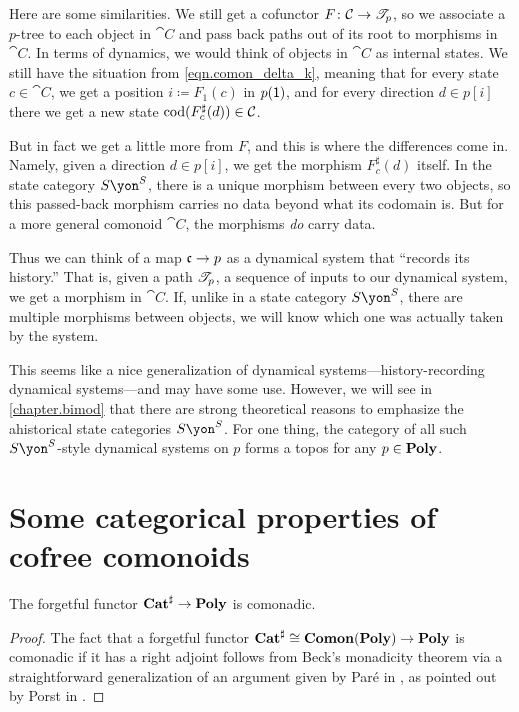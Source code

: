 \documentclass[Book-Poly]{subfiles}
\begin{document}
Here are some similarities. We still get a cofunctor $F\colon\mathcal{C}\to\mathscr{T}_{p}$, so we associate a $p$-tree to each object in $\cat{C}$ and pass back paths out of its root to morphisms in $\cat{C}$. In terms of dynamics, we would think of objects in $\cat{C}$ as internal states. We still have the situation from \eqref{eqn.comon_delta_k}, meaning that for every state $c\in\cat{C}$, we get a position $i\coloneqq F_1(c)$ in $p(\textsf{1})$, and for every direction $d\in p[i]$ there we get a new state $\operatorname{cod}(F^\sharp_c(d))\in\mathcal{C}$. 

But in fact we get a little more from $F$, and this is where the differences come in. Namely, given a direction $d\in p[i]$, we get the morphism $F^\sharp_c(d)$ itself. In the state category $S\yon^S$, there is a unique morphism between every two objects, so this passed-back morphism carries no data beyond what its codomain is. But for a more general comonoid $\cat{C}$, the morphisms \emph{do} carry data. 

Thus we can think of a map $\mathfrak{c}\to p$ as a dynamical system that ``records its history.'' That is, given a path $\mathscr{T}_{p}$, a sequence of inputs to our dynamical system, we get a morphism in $\cat{C}$. If, unlike in a state category $S\yon^S$, there are multiple morphisms between objects, we will know which one was actually taken by the system.

This seems like a nice generalization of dynamical systems---history-recording dynamical systems---and may have some use. However, we will see in \cref{chapter.bimod} that there are strong theoretical reasons to emphasize the ahistorical state categories $S\yon^S$. For one thing, the category of all such $S\yon^S$-style dynamical systems on $p$ forms a topos for any $p\in\mathbf{Poly}$.


\section{Some categorical properties of cofree comonoids}

\begin{proposition}[Porst]
The forgetful functor $\mathbf{Cat}^\sharp\to\mathbf{Poly}$ is comonadic.
\end{proposition}
\begin{proof}
The fact that a forgetful functor $\mathbf{Cat}^\sharp\cong\mathbf{Comon}(\mathbf{Poly})\to\mathbf{Poly}$ is comonadic if it has a right adjoint follows from Beck's monadicity theorem via a straightforward generalization of an argument given by Par{\'e} in \cite[pp.~138-9]{pare1969absolute}, as pointed out by Porst in \cite[Fact~3.1]{porst2019colimits}.
\end{proof}
\end{document}
